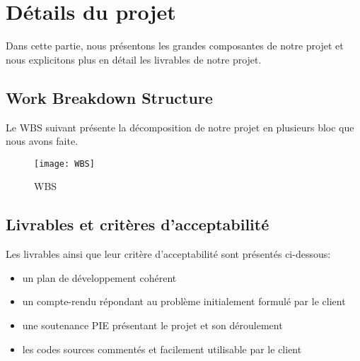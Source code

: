 \chapter*{Détails du projet}
\label{chap:detail}

Dans cette partie, nous présentons les grandes composantes de notre projet et nous explicitons plus en détail les livrables de notre projet.

\section*{Work Breakdown Structure}
Le WBS suivant présente la décomposition de notre projet en plusieurs bloc que nous avons faite.

\begin{figure}[!h]
	\centering
	\texttt{[image: WBS]}
	\caption{WBS}
	\label{fig:wbs}
\end{figure}
 
\section*{Livrables et critères d'acceptabilité}
Les livrables ainsi que leur critère d'acceptabilité sont présentés ci-dessous:
\begin{itemize}
	\item un plan de développement cohérent
	\item un compte-rendu répondant au problème initialement formulé par le client
	\item une soutenance PIE présentant le projet et son déroulement
	\item les codes sources commentés et facilement utilisable par le client
\end{itemize}

